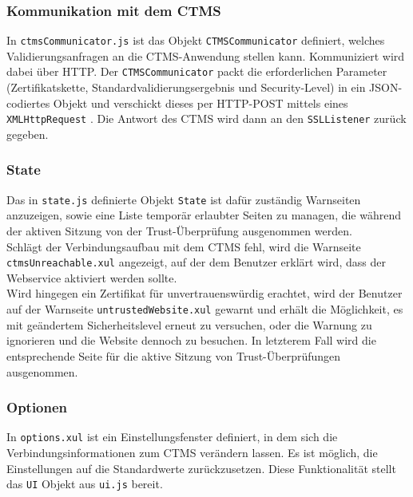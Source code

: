 \documentclass[accentcolor=tud1c,article,colorback,11pt]{tudreport}
\begin{document}
\subsubsection{Kommunikation mit dem CTMS}
In \texttt{ctmsCommunicator.js} ist das Objekt \texttt{CTMSCommunicator} definiert, welches Validierungsanfragen an die CTMS-Anwendung stellen kann. Kommuniziert wird dabei über HTTP. Der \texttt{CTMSCommunicator} packt die erforderlichen Parameter (Zertifikatskette, Standardvalidierungsergebnis und Security-Level) in ein JSON-codiertes Objekt und verschickt dieses per HTTP-POST mittels eines \texttt{XMLHttpRequest} \cite{httpRequest}. Die Antwort des CTMS wird dann an den \texttt{SSLListener} zurück gegeben.

\subsubsection{State}
Das in \texttt{state.js} definierte Objekt \texttt{State} ist dafür zuständig Warnseiten anzuzeigen, sowie eine Liste temporär erlaubter Seiten zu managen, die während der aktiven Sitzung von der Trust-Überprüfung ausgenommen werden.\\
Schlägt der Verbindungsaufbau mit dem CTMS fehl, wird die Warnseite \texttt{ctmsUnreachable.xul} angezeigt, auf der dem Benutzer erklärt wird, dass der Webservice aktiviert werden sollte.\\
Wird hingegen ein Zertifikat für unvertrauenswürdig erachtet, wird der Benutzer auf der Warnseite \texttt{untrustedWebsite.xul} gewarnt und erhält die Möglichkeit, es mit geändertem Sicherheitslevel erneut zu versuchen, oder die Warnung zu ignorieren und die Website dennoch zu besuchen. In letzterem Fall wird die entsprechende Seite für die aktive Sitzung von Trust-Überprüfungen ausgenommen.

\subsubsection{Optionen} 
In \texttt{options.xul} ist ein Einstellungsfenster definiert, in dem sich die Verbindungsinformationen zum CTMS verändern lassen. Es ist möglich, die Einstellungen auf die Standardwerte zurückzusetzen. Diese Funktionalität stellt das \texttt{UI} Objekt aus \texttt{ui.js} bereit.

\newpage


\end{document}
